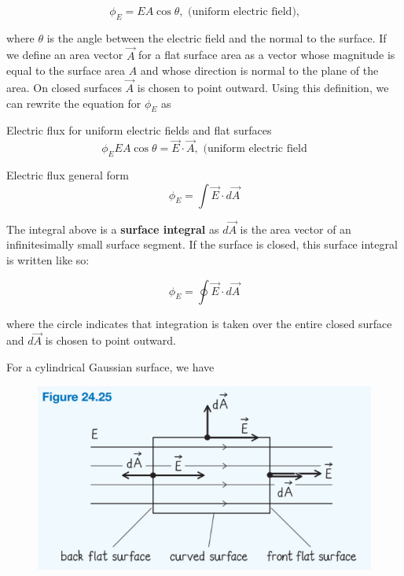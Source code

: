         \[
            \phi_E = EA \cos{\theta}, \text{ (uniform electric field),}
        \]

        where $\theta$ is the angle between the electric field and the normal to the surface. If we define an area vector $\vec{A}$ for a flat surface area as a vector whose magnitude is equal to the surface area $A$ and
        whose direction is normal to the plane of the area. On closed surfaces $\vec{A}$ is chosen to point outward. Using this definition, we can rewrite the equation for $\phi_E$ as

        \begin{theorem}{Electric flux for uniform electric fields and flat surfaces}
            \[
                \phi_E EA\cos{\theta} = \vec{E}\cdot \vec{A}, \text{ (uniform electric field}
            \]
        \end{theorem}

        \begin{theorem}{Electric flux general form}
            \[
                \phi_E = \int \vec{E}\cdot d \vec{A}
            \]

            The integral above is a \textbf{surface integral} as $d\vec{A}$ is the area vector of an infinitesimally small surface segment. If the surface is closed, this surface integral is written like so:

            \[
                \phi_E = \oint \vec{E}\cdot d\vec{A}
            \]

            where the circle indicates that integration is taken over the entire closed surface and $d\vec{A}$ is chosen to point outward.
        \end{theorem}

        For a cylindrical Gaussian surface, we have

        \begin{figure}[hbt!]
            \centering
            \includegraphics[scale = 0.75]{Resources/24.6_Flux}
        \end{figure}

